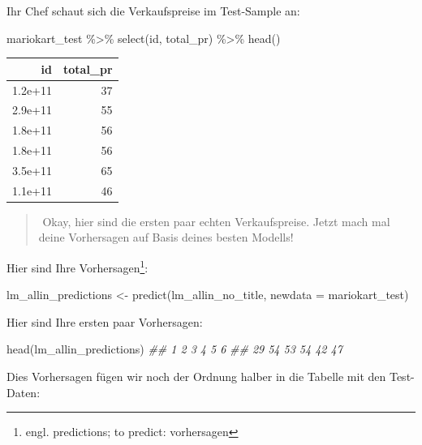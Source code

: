 \documentclass[
  a4paper,
]{scrbook}
\newenvironment{Shaded}{\begin{snugshade}}{\end{snugshade}}
\newcommand{\AttributeTok}[1]{\textcolor[rgb]{0.40,0.45,0.13}{#1}}
\newcommand{\DocumentationTok}[1]{\textcolor[rgb]{0.37,0.37,0.37}{\textit{#1}}}
\newcommand{\FunctionTok}[1]{\textcolor[rgb]{0.28,0.35,0.67}{#1}}
\newcommand{\NormalTok}[1]{\textcolor[rgb]{0.00,0.23,0.31}{#1}}
\newcommand{\OtherTok}[1]{\textcolor[rgb]{0.00,0.23,0.31}{#1}}
\newcommand{\SpecialCharTok}[1]{\textcolor[rgb]{0.37,0.37,0.37}{#1}}
\theoremstyle{definition}
\theoremstyle{definition}
\theoremstyle{definition}
\theoremstyle{remark}
\begin{document}
Ihr Chef schaut sich die Verkaufspreise im Test-Sample an:

\begin{Shaded}
\begin{Highlighting}[]
\NormalTok{mariokart\_test }\SpecialCharTok{\%\textgreater{}\%} 
  \FunctionTok{select}\NormalTok{(id, total\_pr) }\SpecialCharTok{\%\textgreater{}\%} 
  \FunctionTok{head}\NormalTok{()}
\end{Highlighting}
\end{Shaded}

\begin{longtable}[]{@{}rr@{}}
\toprule\noalign{}
id & total\_pr \\
\midrule\noalign{}
\endhead
\bottomrule\noalign{}
\endlastfoot
1.2e+11 & 37 \\
2.9e+11 & 55 \\
1.8e+11 & 56 \\
1.8e+11 & 56 \\
3.5e+11 & 65 \\
1.1e+11 & 46 \\
\end{longtable}

\begin{quote}
{}️ Okay, hier sind die ersten paar echten Verkaufspreise.
Jetzt mach mal deine Vorhersagen auf Basis deines besten Modells!
\end{quote}

Hier sind Ihre Vorhersagen\footnote{engl. predictions; to predict:
  vorhersagen}:

\begin{Shaded}
\begin{Highlighting}[]
\NormalTok{lm\_allin\_predictions }\OtherTok{\textless{}{-}} \FunctionTok{predict}\NormalTok{(lm\_allin\_no\_title, }\AttributeTok{newdata =}\NormalTok{ mariokart\_test)}
\end{Highlighting}
\end{Shaded}

Hier sind Ihre ersten paar Vorhersagen:

\begin{Shaded}
\begin{Highlighting}[]
\FunctionTok{head}\NormalTok{(lm\_allin\_predictions)}
\DocumentationTok{\#\#  1  2  3  4  5  6 }
\DocumentationTok{\#\# 29 54 53 54 42 47}
\end{Highlighting}
\end{Shaded}

Dies Vorhersagen fügen wir noch der Ordnung halber in die Tabelle mit
den Test-Daten:
\end{document}
